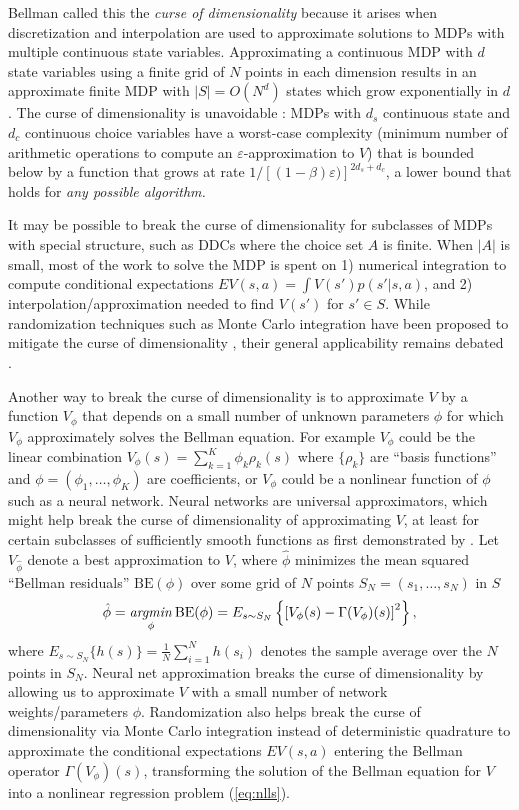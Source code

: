 Bellman called this  the {\it curse of dimensionality\/} because it arises 
when  discretization and interpolation are used to approximate solutions to MDPs with multiple continuous state variables. 
Approximating a continuous MDP with $d$ state variables using a finite grid of $N$ points in each dimension 
results in an approximate finite MDP with $|S|=O(N^d)$ states which grow exponentially in $d$. The curse of dimensionality is unavoidable \citep{CT:1989}:  MDPs with $d_s$ continuous state and $d_c$ continuous choice variables
have a worst-case complexity (minimum number of arithmetic operations to compute an $\varepsilon$-approximation to $V$) 
that is bounded below by a function that grows at rate  $1/[(1-\beta)\varepsilon)]^{2d_s+d_c}$, a  lower bound that holds for {\it any possible 
algorithm.\/}

It may be possible to break the curse of dimensionality for subclasses of MDPs with special structure, such as  DDCs 
where the choice set $A$ is finite. When $|A|$ is small, most of the work to solve the MDP is spent on 1) numerical integration to
compute conditional expectations $EV(s,a)=\int V(s')p(s'|s,a)$, and 2) interpolation/approximation needed to find $V(s')$ for $s' \in S$.
While randomization techniques such as Monte Carlo integration have been proposed to mitigate the curse of dimensionality \citep{rust:1997}, their general applicability remains debated \citep{bray:2022}.

Another way to break the curse of dimensionality is to approximate $V$ by a function $V_\phi$  
that depends on a small number of unknown parameters $\phi$ for which $V_\phi$ approximately
solves the Bellman equation. For example $V_\phi$ could be the linear combination
$V_\phi(s)=\sum_{k=1}^K \phi_k \rho_k(s)$ where $\{\rho_k\}$ are ``basis functions'' and $\phi=(\phi_1,\ldots,\phi_K)$ are
coefficients, or $V_\phi$ could be a nonlinear function of $\phi$ such as a neural network.
Neural networks are universal approximators, which might help break the curse of dimensionality of approximating $V$, 
at least for certain subclasses of sufficiently smooth functions as first demonstrated by \citet{Barron1993}.
Let $V_{\hat\phi}$ denote 
a best approximation to $V$, where $\hat\phi$  
minimizes the mean squared ``Bellman residuals'' $\mbox{BE}(\phi)$
 over some grid of $N$ points $S_N=(s_1,\ldots,s_N)$ in $S$
\begin{equation}
      \hat\phi = \mathop{\it argmin}_{\phi} \mbox{BE}(\phi)=E_{s \sim S_N}\left\{\left[V_\phi(s)- \Gamma(V_\phi)(s)\right]^2\right\},
\label{eq:nlls}
\end{equation}
where $E_{s \sim S_N}\{h(s)\}=\frac{1}{N} \sum_{i=1}^N h(s_i)$ denotes the sample average over the $N$ points in $S_N$.
Neural net approximation breaks the curse of dimensionality by allowing us to approximate $V$ with a small number
of network weights/parameters $\phi$.  Randomization also helps break the curse of dimensionality via
Monte Carlo integration instead of deterministic quadrature to approximate the  
conditional expectations $EV(s,a)$ entering the Bellman operator
$\Gamma(V_\phi)(s)$, transforming the solution of the Bellman equation for $V$ into a nonlinear regression problem (\ref{eq:nlls}).


